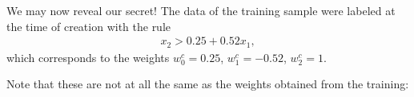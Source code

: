 \documentclass[a4paper,12pt,polish]{jupyterBook}
\begin{document}
\sphinxAtStartPar
We may now reveal our secret! The data of the training sample  were labeled at the time of creation with the rule
\begin{equation*}
\begin{split} x_2>0.25+0.52 x_1, \end{split}
\end{equation*}
\sphinxAtStartPar
which corresponds to the weights \(w_0^c=0.25\), \(w_1^c=-0.52\), \(w_2^c=1\).
\begin{sphinxVerbatimInput}

\begin{sphinxVerbatim}[commandchars=\\\{\}]
\PYG{p}{[}\PYG{p}{]} 
\end{sphinxVerbatim}
\end{sphinxVerbatimInput}
\begin{sphinxVerbatimOutput}

\begin{sphinxVerbatim}
\end{sphinxVerbatim}
\end{sphinxVerbatimOutput}

\sphinxAtStartPar
Note that these are not at all the same as the weights obtained from the training:
\begin{sphinxVerbatimInput}

\begin{sphinxVerbatim}[commandchars=\\\{\}]
\end{sphinxVerbatim}
\end{sphinxVerbatimInput}
\begin{sphinxVerbatimOutput}

\begin{sphinxVerbatim}
\end{sphinxVerbatim}
\end{sphinxVerbatimOutput}
\end{document}
